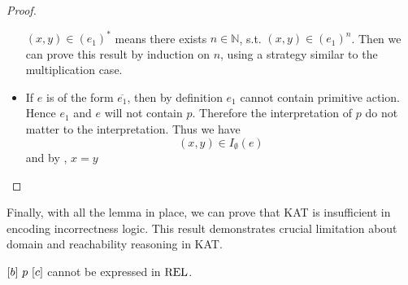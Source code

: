 \begin{proof}
\begin{itemize}
        \((x, y) ∈ (e_1)^*\) means there exists \(n ∈ ℕ\),
        s.t. \((x, y) ∈ {(e_1)}^{n}\).
        Then we can prove this result by induction on \(n\), 
        using a strategy similar to the multiplication case.
        \item If \(e\) is of the form \(\overline{e_1}\),
        then by definition \(e_1\) cannot contain primitive action.
        Hence \(e_1\) and \(e\) will not contain \(p\).
        Therefore the interpretation of \(p\) do not matter to the interpretation.
        Thus we have \[(x, y) ∈ I_∅(e)\]
        and by , \(x = y\) \qedhere
    \end{itemize}
\end{proof}

Finally, with all the lemma in place, we can prove that KAT is insufficient in encoding incorrectness logic. 
This result demonstrates crucial limitation about domain and reachability reasoning in KAT.

\begin{theorem}\label{the: KAT not able to express incorrectness logic}
    \([b]~p~[c]\)
    cannot be expressed in \(\mathbf{\mathrm{REL}}\).
\end{theorem}

